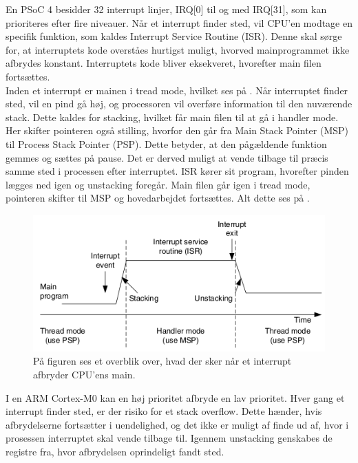 En PSoC 4 besidder 32 interrupt linjer, IRQ[0] til og med IRQ[31], som kan prioriteres efter fire niveauer. %
Når et interrupt finder sted, vil CPU'en modtage en specifik funktion, som kaldes Interrupt Service Routine (ISR). Denne skal sørge for, at interruptets kode overståes hurtigst muligt, hvorved mainprogrammet ikke afbrydes konstant. Interruptets kode bliver eksekveret, hvorefter main filen fortsættes. \citep{Badiger2016}\\
Inden et interrupt er mainen i tread mode, hvilket ses på . Når interruptet finder sted, vil en pind gå høj, og processoren vil overføre information til den nuværende stack. Dette kaldes for stacking, hvilket får main filen til at gå i handler mode. Her skifter pointeren også stilling, hvorfor den går fra Main Stack Pointer (MSP) til Process Stack Pointer (PSP). Dette betyder, at den pågældende funktion gemmes og sættes på pause. Det er derved muligt at vende tilbage til præcis samme sted i processen efter interruptet. ISR kører sit program, hvorefter pinden lægges ned igen og unstacking foregår. Main filen går igen i tread mode, pointeren skifter til MSP og hovedarbejdet fortsættes. Alt dette ses på . \citep{Badiger2016,Tanenbaum2006}
\begin{figure}[H]
	\centering
	\includegraphics[scale=0.68]{figures/bProblemloesning/interrupt.png}
	\caption{På figuren ses et overblik over, hvad der sker når et interrupt afbryder CPU'ens main. \citep{Tanenbaum2006}}
	\label{fig:interrupt}
\end{figure}\vspace{-0.5cm}
I en ARM Cortex-M0 kan en høj prioritet afbryde en lav prioritet. Hver gang et interrupt finder sted, er der risiko for et stack overflow. Dette hænder, hvis afbrydelserne fortsætter i uendelighed, og det ikke er muligt af finde ud af, hvor i prosessen interruptet skal vende tilbage til. %
Igennem unstacking genskabes de registre fra, hvor afbrydelsen oprindeligt fandt sted. \citep{Badiger2016}


